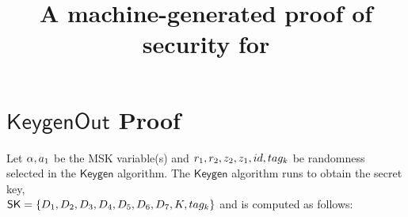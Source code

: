 \documentclass[11pt]{article}
\begin{document}
%


\newtheorem{definition}{Definition}
\newtheorem{theorem}{Theorem}
\newcommand{\Oracle}{\mathcal{O}}
\newcommand{\Adv}{\mathcal{A}}
\newcommand{\Bdv}{\mathcal{B}}
\newcommand{\MS}{\mathcal{M}}
\newcommand{\Psetup}{\mathsf{PSetup}}
\newcommand{\Msetup}{\mathsf{Setup}}
\newcommand{\params}{\mathit{params}}
\newcommand{\brk}[1]{\langle #1 \rangle}
\newcommand{\ait}[1]{#1}
\newcommand{\Ga}{\ait{\mathbb{G}}_1}
\newcommand{\ga}{\ait{g}_1}
\newcommand{\ha}{\ait{h}_1}
\newcommand{\poly}{\mathrm{poly}}

\newcommand{\bit}[1]{#1}
\newcommand{\Gb}{\bit{\mathbb{G}}_2}
\newcommand{\gb}{\bit{g}_2}
\newcommand{\hb}{\bit{h}_2}

\newcommand{\cit}[1]{#1}
\newcommand{\Gc}{\cit{\Group_T}}
\newcommand{\gc}{\cit{g}}
\newcommand{\hc}{\cit{h}}
\newcommand{\Zp}{\mathbb{Z}_p}

\newcommand{\Group}{\ensuremath{\mathbb{G}}\xspace}
\newcommand{\Hroup}{\ensuremath{\mathbb{H}}\xspace}
\newcommand{\map}{\mathbf{e}}

\newcommand{\prot}{\mathsf{Prot}}
\newcommand{\auxext}{\mathit{auxext}}
\newcommand{\auxsim}{\mathit{auxsim}}
\newcommand{\aux}{\mathit{aux}}
\newcommand{\state}{\mathit{state}}
\newcommand{\Alg}{\mathsf{Alg}}
\newcommand{\A}{\mathcal{A}}

\newcommand{\Sig}{\mathsf{Sig}}
\newcommand{\G}{\mathsf{Gen}}
\newcommand{\SK}{\mathsf{SK}}
\newcommand{\CT}{\mathsf{CT}}
\newcommand{\Screen}{\mathsf{Screen}}
\newcommand{\Setup}{\mathsf{Setup}}
\newcommand{\Keygen}{\mathsf{Keygen}}
\newcommand{\KeygenOut}{\mathsf{KeygenOut}}
\newcommand{\Transform}{\mathsf{Transform}}
\newcommand{\Decrypt}{\mathsf{Decrypt}}
\newcommand{\Decout}{\mathsf{DecOut}}
\newcommand{\compareequals}{\stackrel{?}{=}}
\newcommand{\numsigs}{\eta}

\title{A machine-generated proof of security for {\schemename}}
\author{}
\date{}
\maketitle

\section{$\KeygenOut$ Proof}

Let $\alpha,a_1$ be the MSK variable(s) and $r_1,r_2,z_2,z_1,id,tag_k$ be randomness selected in the $\Keygen$ algorithm. The $\Keygen$ algorithm runs to obtain the secret key, \\ $\SK = \{\secretkey\}$ and is computed as follows:
\end{document}
